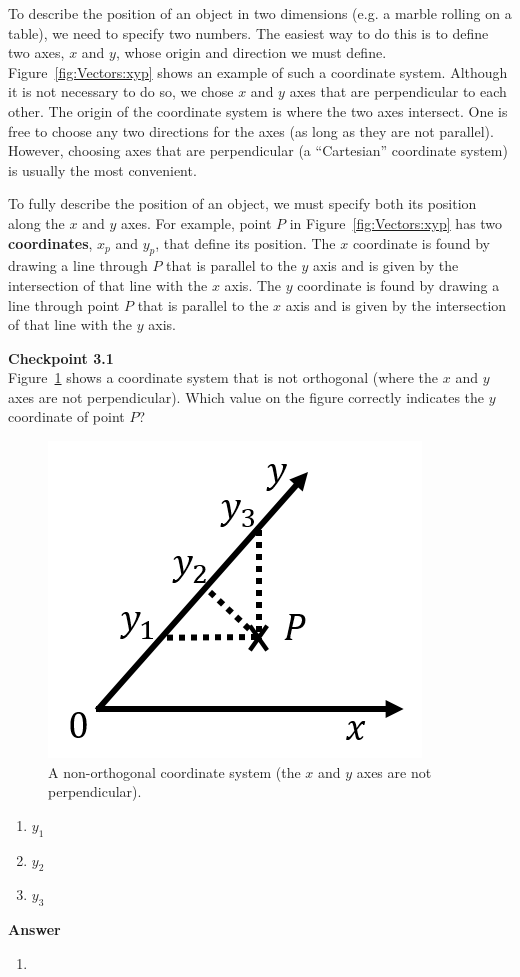 To describe the position of an object in two dimensions (e.g. a marble rolling on a table), we need to specify two numbers. The easiest way to do this is to define two axes, $x$ and $y$, whose origin and direction we must define. Figure~\ref{fig:Vectors:xyp} shows an example of such a coordinate system. Although it is not necessary to do so, we chose $x$ and $y$ axes that are perpendicular to each other. The origin of the coordinate system is where the two axes intersect. One is free to choose any two directions for the axes (as long as they are not parallel). However, choosing axes that are perpendicular (a ``Cartesian'' coordinate system) is usually the most convenient.

To fully describe the position of an object, we must specify both its position along the $x$ and $y$ axes. For example, point $P$ in Figure~\ref{fig:Vectors:xyp} has two \textbf{coordinates}, $x_p$ and $y_p$, that define its position. The $x$ coordinate is found by drawing a line through $P$ that is parallel to the $y$ axis and is given by the intersection of that line with the $x$ axis. The $y$ coordinate is found by drawing a line through point $P$ that is parallel to the $x$ axis and is given by the intersection of that line with the $y$ axis.

\begin{framed}
\textbf{Checkpoint 3.1}\\
Figure~\ref{fig:Vectors:xyslant} shows a coordinate system that is not orthogonal (where the $x$ and $y$ axes are not perpendicular). Which value on the figure correctly indicates the $y$ coordinate of point $P$?

\begin{figure}[!htbp]
\centering
\includegraphics[width=0.375\linewidth]{files/xyslant-b599cfc4e7acffafabef336001b883bd.png}
\caption[]{A non-orthogonal coordinate system (the $x$ and $y$ axes are not perpendicular).}
\label{fig:Vectors:xyslant}
\end{figure}

\begin{enumerate}
\item $y_1$
\item $y_2$
\item $y_3$
\end{enumerate}

\begin{framed}
\textbf{Answer}\\
\begin{enumerate}
\item
\end{enumerate}
\end{framed}
\end{framed}

